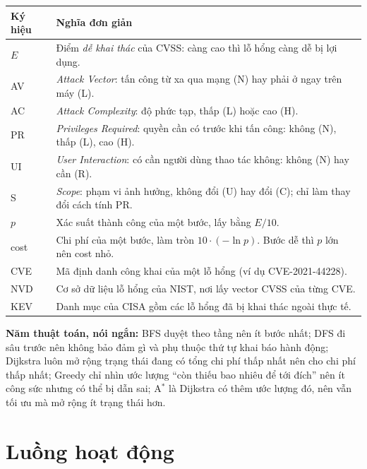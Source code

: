 \documentclass[11pt,a4paper]{article}
\begin{document}
\begin{center}\small
\begin{tabular}{@{}Y{2.6cm}Y{13.2cm}@{}}
\toprule
Ký hiệu & Nghĩa đơn giản \\
\midrule
$E$ & Điểm \emph{dễ khai thác} của CVSS: càng cao thì lỗ hổng càng dễ bị lợi dụng. \\
AV & \emph{Attack Vector}: tấn công từ xa qua mạng (N) hay phải ở ngay trên máy (L). \\
AC & \emph{Attack Complexity}: độ phức tạp, thấp (L) hoặc cao (H). \\
PR & \emph{Privileges Required}: quyền cần có trước khi tấn công: không (N), thấp (L), cao (H). \\
UI & \emph{User Interaction}: có cần người dùng thao tác không: không (N) hay cần (R). \\
S & \emph{Scope}: phạm vi ảnh hưởng, không đổi (U) hay đổi (C); chỉ làm thay đổi cách tính PR. \\
$p$ & Xác suất thành công của một bước, lấy bằng $E/10$. \\
cost & Chi phí của một bước, làm tròn $10\cdot(-\ln p)$. Bước dễ thì $p$ lớn nên cost nhỏ. \\
CVE & Mã định danh công khai của một lỗ hổng (ví dụ CVE-2021-44228). \\
NVD & Cơ sở dữ liệu lỗ hổng của NIST, nơi lấy vector CVSS của từng CVE. \\
KEV & Danh mục của CISA gồm các lỗ hổng đã bị khai thác ngoài thực tế. \\
\bottomrule
\end{tabular}
\end{center}

\textbf{Năm thuật toán, nói ngắn:} BFS duyệt theo tầng nên ít bước nhất; DFS đi sâu trước nên không bảo đảm gì và phụ thuộc thứ tự khai báo hành động; Dijkstra luôn mở rộng trạng thái đang có tổng chi phí thấp nhất nên cho chi phí thấp nhất; Greedy chỉ nhìn ước lượng ``còn thiếu bao nhiêu để tới đích'' nên ít công sức nhưng có thể bị dẫn sai; A$^{*}$ là Dijkstra có thêm ước lượng đó, nên vẫn tối ưu mà mở rộng ít trạng thái hơn.

\section{Luồng hoạt động}
\end{document}
